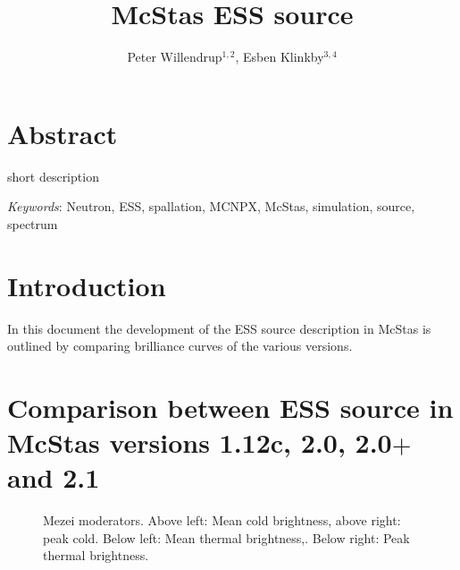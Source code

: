 \documentclass{elsarticle}
\begin{document}
\setpagewiselinenumbers
\begin{frontmatter}
\title{McStas ESS source}
\author{Peter Willendrup$^{1,2}$, Esben Klinkby$^{3,4}$}
\address{1) DTU Physics, Technical University of Denmark, DTU Lyngby Campus, Anker Engelunds Vej 1, DK-2800 Kgs. Lyngby, Denmark}
\address{2) ESS design update programme - Denmark}
\address{3) European Spallation Source ESS AB, Box 176, S-221 00 Lund, Sweden}
\address{4) DTU Nutech, Technical University of Denmark, DTU Ris\o~Campus,\\ Frederiksborgvej 399, DK-4000 Roskilde, Denmark}
\end{frontmatter}
\section{Abstract}
short description




\emph{Keywords}: Neutron, ESS, spallation, MCNPX, McStas, simulation, source, spectrum

\section{Introduction}
In this document the development of the ESS source description in McStas\cite{lefm:1999,will:2013,man,comp} is outlined by comparing brilliance curves of the various versions.

\section{Comparison between ESS source in McStas versions 1.12c, 2.0,
  2.0$+$ and 2.1}
\label{sec:val}

\begin{figure}[h!]
\begin{minipage}{\linewidth}
\centering
{}
\caption{Mezei moderators. Above left: Mean cold brightness, above right: peak cold. Below left: Mean thermal brightness,. Below right: Peak thermal brightness.}
\label{fig:2001}
\end{minipage}\hfill
\end{figure}
\end{document}
